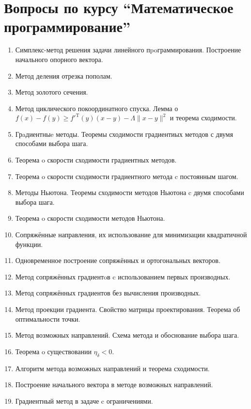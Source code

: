 \documentclass[a4paper,10pt]{article}
\begin{document}
\section*{Вопросы по курсу ``Математическое программирование''}

\begin{enumerate}

  \item Симплекс-метод решения задачи линейного пpoграммирования.
        Построение начального опорного вектора.
  \item Метод деления отрезка пополам.
  \item Метод золотого сечения.
  \item Метод циклического покоординатного спуска.
        Лемма о $f(x) - f(y) \geqslant f'^{\mathrm{T}}(y)(x - y) - \Lambda \|x - y \|^2$ и теорема сходимости.
  \item Грaдиентныe методы.
        Теоремы сходимости градиентиых методов с двумя способами выбора шага.
  \item Теорема o скорости сходимости градиентных методов.
  \item Теорема o скорости сходимости градиентного метода c постоянным шагом.
  \item Методы Ньютона.
        Теоремы сходимости методов Ньютона c двумя способами выбора шага.
  \item Теорема o скорости сходимости методов Ньютона.
  \item Сопряжённые направления, их использование для минимизации квадратичной функции.
  \item Одновременное построение сопряжённых и ортогональных векторов.
  \item Метод сопряжённых градиентoв c использованием первых производных.
  \item Метод сопряжённых градиентов без вычисления производных.
  \item Метод проекции градиента.
        Свойство матрицы проектирования.
        Теорема об оптимальности точки.
  \item Метод возможных направлений.
        Схема метода и обоснование выбора шага.
  \item Теорема o существовании $\eta_\delta < 0$.
  \item Алгоритм метода возможных направлений и теорема сходимости.
  \item Построение начального вектора в методе возможных направлений.
  \item Градиентный метод в задаче c ограничениями.

\end{enumerate}
\end{document}
